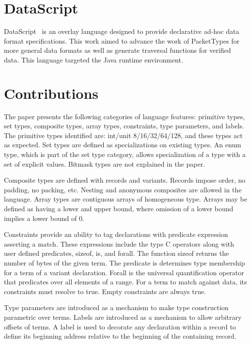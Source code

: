\section{DataScript}

DataScript~\cite{datascript} is an overlay language designed to provide 
declarative ad-hoc data format specifications. This work aimed to advance the 
work of PacketTypes for more general data formats as well as generate
traversal functions for verified data. This language targeted the Java
runtime environment.

\section{Contributions}

The paper presents the following categories of language features:
primitive types, set types, composite types, array types, constraints,
type parameters, and labels. The primitive types identified are:
int/unit 8/16/32/64/128, and these types act as expected. Set types are
defined as specializations on existing types. An enum type, which is 
part of the set type category, allows specialization of a type with
a set of explicit values. Bitmask types are not explained in the paper.

Composite types are defined with records and variants. Records impose
order, no padding, no packing, etc. Nesting and anonymous composites are
allowed in the language. Array types are contiguous arrays of homogeneous
type. Arrays may be defined as having a lower and upper bound, where omission
of a lower bound implies a lower bound of 0.

Constraints provide an ability to tag declarations with predicate expression
asserting a match. These expressions include the type C operators along with
user defined predicates, sizeof, is, and forall. The function sizeof returns
the number of bytes of the given term. The predicate is determines type
membership for a term of a variant declaration. Forall is the universal
quantification operator that predicates over all elements of a range. For a
term to match against data, its constraints must resolve to true. Empty 
constraints are always true.

Type parameters are introduced as a mechanism to make type construction
parametric over terms. Labels are introduced as a mechanism to allow arbitrary 
offsets of terms. A label is used to decorate any declaration within a record to
define its beginning address relative to the beginning of the containing record.

